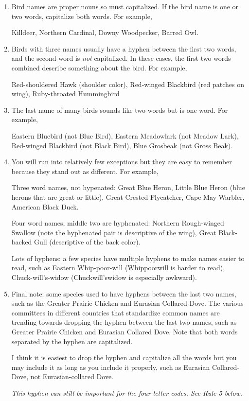 \documentclass[11pt]{article}
\begin{document}
\begin{enumerate}
\item Bird names are proper nouns so must capitalized. If the bird name is one or two words, capitalize both words. For example,

Killdeer, Northern Cardinal, Downy Woodpecker, Barred Owl.

\item Birds with three names usually have a hyphen between the first two words, and the second word is \emph{not} capitalized.  In these cases, the first two words combined describe something about the bird. For example,

Red-shouldered Hawk (shoulder color), Red-winged Blackbird (red patches on wing), Ruby-throated Hummingbird

\item The last name of many birds sounds like two words but is one word. For example,

Eastern Bluebird (not Blue Bird), Eastern Meadowlark (not Meadow Lark), Red-winged Blackbird (not Black Bird), Blue Grosbeak (not Gross Beak).

\item You will run into relatively few exceptions but they are easy to remember because they stand out as different. For example,

Three word names, not hypenated: Great Blue Heron, Little Blue Heron (blue herons that are great or little), Great Crested Flycatcher, Cape May Warbler, American Black Duck. 

Four word names, middle two are hyphenated: Northern Rough-winged Swallow (note the hyphenated pair is descriptive of the wing), Great Black-backed Gull (descriptive of the back color).

Lots of hyphens: a few species have multiple hyphens to make names easier to read, such as Eastern Whip-poor-will (Whippoorwill is harder to read), Chuck-will's-widow (Chuckwill'swidow is especially awkward).

\item Final note: some species used to have hyphens between the last two names, such as the Greater Prairie-Chicken and Eurasian Collared-Dove. The various committees in different countries that standardize common names are trending towards dropping the hyphen between the last two names, such as Greater Prairie Chicken and Eurasian Collared Dove. Note that both words separated by the hyphen are capitalized.

I think it is easiest to drop the hyphen and capitalize all the words but you may include it as long as you include it properly, such as Eurasian Collared-Dove, not Eurasian-collared Dove. 

\emph{This hyphen can still be important for the four-letter codes. See Rule 5 below.}


\end{enumerate}
\end{document}
